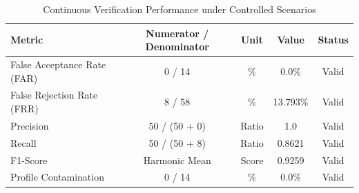 \begin{table}[htbp]
\centering
\caption{Continuous Verification Performance under Controlled Scenarios}
\label{tab:verification_metrics}
\begin{tabular}{lcccc}
\toprule
\textbf{Metric} & \textbf{Numerator / Denominator} & \textbf{Unit} & \textbf{Value} & \textbf{Status} \\
\midrule
False Acceptance Rate (FAR) & 0 / 14 & \% & 0.0\% & Valid \\
False Rejection Rate (FRR) & 8 / 58 & \% & 13.793\% & Valid \\
Precision & 50 / (50 + 0) & Ratio & 1.0 & Valid \\
Recall & 50 / (50 + 8) & Ratio & 0.8621 & Valid \\
F1-Score & Harmonic Mean & Score & 0.9259 & Valid \\
Profile Contamination & 0 / 14 & \% & 0.0\% & Valid \\
\bottomrule
\end{tabular}
\end{table}
